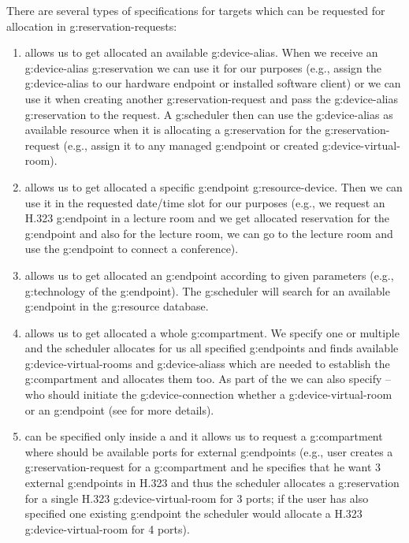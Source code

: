 There are several types of specifications for targets which can be requested for allocation in \glspl{g:reservation-request}:
\begin{enumerate}
\item {} allows us to get allocated an available \gls{g:device-alias}. When we receive an \gls{g:device-alias} \gls{g:reservation} we can use it for our purposes (e.g., assign the \gls{g:device-alias} to our hardware endpoint or installed software client) or we can use it when creating another \gls{g:reservation-request} and pass the \gls{g:device-alias} \gls{g:reservation} to the request. A \gls{g:scheduler} then can use the \gls{g:device-alias} as available resource when it is allocating a \gls{g:reservation} for the \gls{g:reservation-request} (e.g., assign it to any managed \gls{g:endpoint} or created \gls{g:device-virtual-room}). 

\item {} allows us to get allocated a specific \gls{g:endpoint} \gls{g:resource-device}. Then we can use it in the requested date/time slot for our purposes (e.g., we request an H.323 \gls{g:endpoint} in a lecture room and we get allocated reservation for the \gls{g:endpoint} and also for the lecture room, we can go to the lecture room and use the \gls{g:endpoint} to connect a conference).

\item {} allows us to get allocated an \gls{g:endpoint} according to given parameters (e.g., \gls{g:technology} of the \gls{g:endpoint}). The \gls{g:scheduler} will search for an available \gls{g:endpoint} in the \gls{g:resource} database.

\item {} allows us to get allocated a whole \gls{g:compartment}. We specify one or multiple  and the scheduler allocates for us all specified \glspl{g:endpoint} and finds available \glspl{g:device-virtual-room} and \glspl{g:device-alias} which are needed to establish the \gls{g:compartment} and allocates them too. As part of the  we can also specify  -- who should initiate the \gls{g:device-connection} whether a \gls{g:device-virtual-room} or an \gls{g:endpoint} (see  for more details).

\item {} can be specified only inside a  and it allows us to request a \gls{g:compartment} where should be available ports for external \glspl{g:endpoint} (e.g., user creates a \gls{g:reservation-request} for a \gls{g:compartment} and he specifies that he want 3 external \glspl{g:endpoint} in H.323 and thus the scheduler allocates a \gls{g:reservation} for a single H.323 \gls{g:device-virtual-room} for 3 ports; if the user has also specified one existing \gls{g:endpoint} the scheduler would allocate a H.323 \gls{g:device-virtual-room} for 4 ports).


\end{enumerate}
